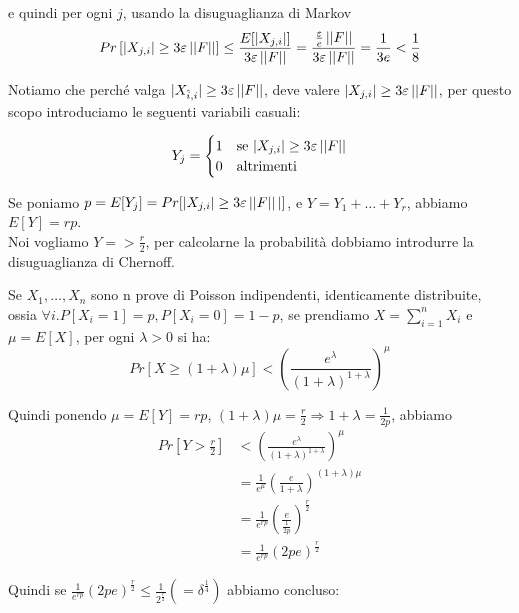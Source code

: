 \begin{proof*}
    e quindi per ogni $j$, usando la disuguaglianza di Markov
    \[
        Pr\left[|X_{j, i}| \ge 3\varepsilon\left|\left|F\right|\right|\right] \le
            \frac{E[|X_{j,i}|]}{3\varepsilon\left|\left|F\right|\right|} 
        = \frac{\frac{\varepsilon}{e} \left|\left|F\right|\right|}{3\varepsilon\left|\left|F\right|\right|}
        = \frac{1}{3e} < \frac{1}{8} \nonumber
    \]

    Notiamo che perché valga $|X_{\hat{i}, i}| \ge 3\varepsilon\left|\left|F\right|\right|$,
    deve valere $|X_{j, i}| \ge 3\varepsilon\left|\left|F\right|\right|$, per questo scopo
    introduciamo le seguenti variabili casuali:

    \[
        Y_j = 
        \begin{cases}
            1 & \mbox{se } |X_{j, i}| \ge 3\varepsilon\left|\left|F\right|\right| \\
            0 & \mbox{altrimenti}
        \end{cases}
    \]

    Se poniamo $p = E[Y_j] = Pr[|X_{j,i}| \ge 3 \varepsilon\left|\left|F\right|\right||]$,
    e $Y = Y_1 + \dots + Y_r$, abbiamo $E[Y] = rp$. \\
    Noi vogliamo $Y = > \frac{r}{2}$, per calcolarne la probabilità dobbiamo
    introdurre la disuguaglianza di Chernoff.

    \begin{definition*}
        Se $X_1, \dots, X_n$ sono n prove di Poisson indipendenti, identicamente
        distribuite, ossia $\forall i. P[X_i = 1] = p, P[X_i = 0] = 1-p$, se
        prendiamo $X=\sum_{i=1}^n X_i$ e $\mu = E[X]$, per ogni $\lambda > 0$ si ha:
        \[ Pr\left[X \ge (1+\lambda)\mu\right] <
            \left(\frac{e^\lambda}{(1+\lambda)^{1+\lambda}}\right)^\mu\]
    \end{definition*}

    Quindi ponendo $\mu = E[Y] = rp$, $(1+\lambda)\mu = \frac{r}{2} \Rightarrow
    1+\lambda = \frac{1}{2p}$, abbiamo
    \begin{align}
        Pr[Y > \frac{r}{2}] &< \left(\frac{e^\lambda}{(1+\lambda)^{1+\lambda}}\right)^\mu \nonumber\\
        &= \frac{1}{e^\mu}\left(\frac{e}{1+\lambda}\right)^{(1+\lambda)\mu} \nonumber \\
        &= \frac{1}{e^{rp}}\left(\frac{e}{\frac{1}{2p}}\right)^{\frac{r}{2}} \nonumber \\
        &= \frac{1}{e^{rp}}(2pe)^{\frac{r}{2}} \nonumber
    \end{align}

    Quindi se $\frac{1}{e^{rp}}(2pe)^{\frac{r}{2}} \le \frac{1}{2^{\frac{r}{2}}} (= \delta^{\frac{1}{4}})$
    abbiamo concluso:


\end{proof*}

